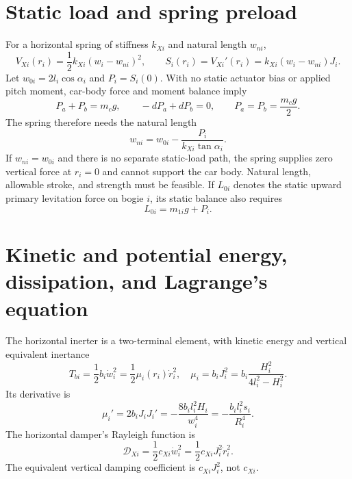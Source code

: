\documentclass[a4paper,11pt]{article}
\numberwithin{equation}{section}
\begin{document}
\section{Static load and spring preload}
For a horizontal spring of stiffness $k_{Xi}$ and natural length $w_{ni}$,
\begin{equation}
V_{Xi}(r_i)=\frac12k_{Xi}(w_i-w_{ni})^2,
\qquad S_i(r_i)=V_{Xi}'(r_i)=k_{Xi}(w_i-w_{ni})J_i.\label{eq:VX}
\end{equation}
Let $w_{0i}=2l_i\cos\alpha_i$ and $P_i=S_i(0)$. With no static actuator bias or applied pitch moment, car-body force and moment balance imply
\begin{equation}
P_a+P_b=m_cg,\qquad -dP_a+dP_b=0,
\qquad P_a=P_b=\frac{m_cg}{2}.\label{eq:static}
\end{equation}
The spring therefore needs the natural length
\begin{equation}
w_{ni}=w_{0i}-\frac{P_i}{k_{Xi}\tan\alpha_i}.\label{eq:wn}
\end{equation}
If $w_{ni}=w_{0i}$ and there is no separate static-load path, the spring supplies zero vertical force at $r_i=0$ and cannot support the car body. Natural length, allowable stroke, and strength must be feasible. If $L_{0i}$ denotes the static upward primary levitation force on bogie $i$, its static balance also requires
\begin{equation}
L_{0i}=m_{1i}g+P_i.\label{eq:lev0}
\end{equation}

\section{Kinetic and potential energy, dissipation, and Lagrange's equation}
The horizontal inerter is a two-terminal element, with kinetic energy and vertical equivalent inertance
\begin{equation}
T_{bi}=\frac12b_i\dot w_i^2=\frac12\mu_i(r_i)\dot r_i^2,
\quad \mu_i=b_iJ_i^2=b_i\frac{H_i^2}{4l_i^2-H_i^2}.\label{eq:mu}
\end{equation}
Its derivative is
\begin{equation}
\mu_i'=2b_iJ_iJ_i'=-\frac{8b_i l_i^2H_i}{w_i^4}
=-\frac{b_i l_i^2s_i}{R_i^4}.\label{eq:mup}
\end{equation}
The horizontal damper's Rayleigh function is
\begin{equation}
\mathcal D_{Xi}=\frac12c_{Xi}\dot w_i^2
=\frac12c_{Xi}J_i^2\dot r_i^2.\label{eq:DX}
\end{equation}
The equivalent vertical damping coefficient is $c_{Xi}J_i^2$, not $c_{Xi}$.
\end{document}
